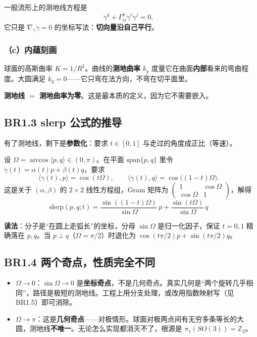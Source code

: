一般流形上的测地线方程是
\[
\ddot\gamma^k+\Gamma^k_{ij}\dot\gamma^i\dot\gamma^j=0,
\]
它只是 $\nabla_{\dot\gamma}\dot\gamma=0$ 的坐标写法：\textbf{切向量沿自己平行}。

\subsubsection{（c）内蕴刻画}

球面的高斯曲率 $K=1/R^2$。曲线的\textbf{测地曲率} $k_g$ 度量它在曲面\textbf{内部}看来的弯曲程度。大圆满足 $k_g=0$——它只弯在法方向，不弯在切平面里。

\textbf{测地线 $=$ 测地曲率为零}。这是最本质的定义，因为它不需要嵌入。

\subsection{BR1.3 slerp 公式的推导}

有了测地线，剩下是\textbf{参数化}：要求 $t\in[0,1]$ 与走过的角度成正比（等速）。

设 $\Omega=\arccos\langle p,q\rangle\in(0,\pi)$。在平面 $\mathrm{span}\{p,q\}$ 里令 $\gamma(t)=\alpha(t)p+\beta(t)q$，要求
\[
\langle\gamma(t),p\rangle=\cos(t\Omega),\qquad
\langle\gamma(t),q\rangle=\cos\big((1-t)\Omega\big).
\]
这是关于 $(\alpha,\beta)$ 的 $2\times 2$ 线性方程组，Gram 矩阵为
$\begin{pmatrix}1&\cos\Omega\\ \cos\Omega&1\end{pmatrix}$，解得
\[
\boxed{\ \mathrm{slerp}(p,q;t)=\frac{\sin((1-t)\Omega)}{\sin\Omega}\,p+\frac{\sin(t\Omega)}{\sin\Omega}\,q\ }
\]

\textbf{读法}：分子是“在圆上走弧长”的坐标，分母 $\sin\Omega$ 是归一化因子，保证 $t=0,1$ 精确落在 $p,q$。当 $p\perp q$（$\Omega=\pi/2$）时退化为 $\cos(t\pi/2)p+\sin(t\pi/2)q$。

\subsection{BR1.4 两个奇点，性质完全不同}

\begin{itemize}
  \item $\Omega\to0$：$\sin\Omega\to0$ 是\textbf{坐标奇点}，不是几何奇点。真实几何是“两个旋转几乎相同”，路径是极短的测地线。工程上用分支处理，或改用指数映射写（见 BR1.5）即可消除。
  \item $\Omega\to\pi$：这是\textbf{几何奇点}——对极情形。球面对极两点间有无穷多条等长的大圆，测地线\textbf{不唯一}。无论怎么实现都消灭不了，根源是 $\pi_1(SO(3))=\mathbb{Z}_2$。
\end{itemize}

